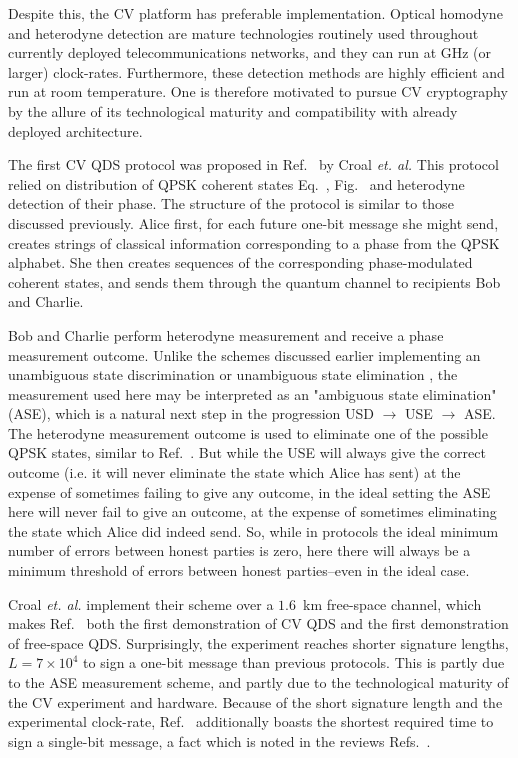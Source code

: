 Despite this, the CV platform has preferable implementation.  Optical homodyne and heterodyne detection are mature technologies routinely used throughout currently deployed telecommunications networks, and they can run at GHz (or larger) clock-rates. Furthermore, these detection methods are highly efficient  and run at room temperature. One is therefore motivated to pursue CV cryptography by the allure of its technological maturity and compatibility with already deployed architecture. 

The first CV QDS protocol was proposed in Ref.~\cite{Croal2016} by Croal \emph{et. al.} This protocol relied on distribution of QPSK coherent states Eq.~, Fig.~ and heterodyne detection of their phase. The structure of the protocol is similar to those discussed previously. Alice first, for each future one-bit message she might send, creates strings of classical information corresponding to a phase from the QPSK alphabet. She then creates sequences of the corresponding phase-modulated coherent states, and sends them through the quantum channel to recipients Bob and Charlie.

Bob and Charlie perform heterodyne measurement and receive a phase measurement outcome. Unlike the schemes discussed earlier implementing an unambiguous state discrimination  or unambiguous state elimination \cite{Donaldson2016}, the measurement used here may be interpreted as an "ambiguous state elimination" (ASE), which is a natural next step in the progression USD $\rightarrow$ USE $\rightarrow$ ASE. The heterodyne measurement outcome is used to eliminate one of the possible QPSK states, similar to Ref.~\cite{Donaldson2016}. But while the USE will always give the correct outcome (i.e. it will never eliminate the state which Alice has sent) at the expense of sometimes failing to give any outcome, in the ideal setting the ASE here will never fail to give an outcome, at the expense of sometimes eliminating the state which Alice did indeed send. So, while in protocols  the ideal minimum number of errors between honest parties is zero, here there will always be a minimum threshold of errors between honest parties--even in the ideal case.

Croal \emph{et. al.} implement their scheme over a $1.6$~km free-space channel, which makes Ref.~\cite{Croal2016} both the first demonstration of CV QDS and the first demonstration of free-space QDS. Surprisingly, the experiment reaches shorter signature lengths, $L = 7 \times 10^4$ to sign a one-bit message than previous protocols. This is partly due to the ASE measurement scheme, and partly due to the technological maturity of the CV experiment and hardware. Because of the short signature length and the experimental clock-rate, Ref.~\cite{Croal2016} additionally boasts the shortest required time to sign a single-bit message, a fact which is noted in the reviews Refs.~\cite{Collins2016, Collins2018}.


